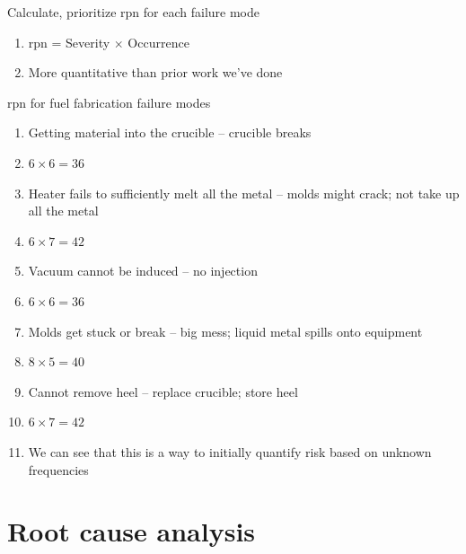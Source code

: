 \documentclass[aspectratio=1610,pdftex,dvipsnames,compress,xcolor={dvipsnames}]{beamer}
\newcommand{\acs}{\acrshort} %
\begin{document}
\addtocounter{framenumber}{-1}
\begin{frame}{Calculate, prioritize  \acs{rpn} for each failure mode}
    \begin{enumerate}[series=outerlist,topsep=0pt,itemsep=21pt,leftmargin=*,label=(\arabic*)]
        \item[]\acs{rpn} = Severity $\times$ Occurrence
        \item[]More quantitative than prior work we've done
    \end{enumerate}
\end{frame}


\begin{frame}{\acs{rpn} for fuel fabrication failure modes}
    \begin{enumerate}[series=outerlist,topsep=0pt,itemsep=3pt,leftmargin=*,label=(\arabic*)]
        \item[]Getting material into the crucible -- crucible breaks
        \item[]$6 \times 6 = 36$
            \vspace{0.10in}
        \item[]Heater fails to sufficiently melt all the metal -- molds might crack; not take up all the metal
        \item[]$6 \times 7 = 42$
            \vspace{0.10in}
        \item[]Vacuum cannot be induced -- no injection
        \item[]$6 \times 6 = 36$
            \vspace{0.10in}
        \item[]Molds get stuck or break -- big mess; liquid metal spills onto equipment
        \item[]$8 \times 5 = 40$
            \vspace{0.10in}
        \item[]Cannot remove heel -- replace crucible; store heel
        \item[]$6 \times 7 = 42$
            \vspace{0.25in}
        \item[]We can see that this is a way to initially quantify risk based on unknown frequencies
    \end{enumerate}
\end{frame}


\section{Root cause analysis}
\end{document}
